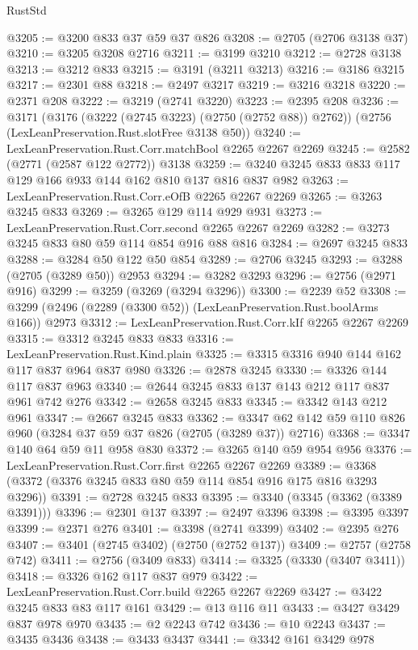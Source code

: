 \begin{lexlean}{RustStd}
\begin{coremodule}
@3205 := @3200 @833 @37 @59 @37 @826
@3208 := @2705 (@2706 @3138 @37)
@3210 := @3205 @3208 @2716
@3211 := @3199 @3210
@3212 := @2728 @3138
@3213 := @3212 @833
@3215 := @3191 (@3211 @3213)
@3216 := @3186 @3215
@3217 := @2301 @88
@3218 := @2497 @3217
@3219 := @3216 @3218
@3220 := @2371 @208
@3222 := @3219 (@2741 @3220)
@3223 := @2395 @208
@3236 := @3171
    (@3176 (@3222 (@2745 @3223) (@2750 (@2752 @88)) @2762))
    (@2756 (LexLeanPreservation.Rust.slotFree @3138 @50))
@3240 := LexLeanPreservation.Rust.Corr.matchBool @2265 @2267 @2269
@3245 := @2582 (@2771 (@2587 @122 @2772)) @3138
@3259 := @3240 @3245 @833 @833 @117 @129 @166 @933 @144 @162 @810 @137 @816 @837 @982
@3263 := LexLeanPreservation.Rust.Corr.eOfB @2265 @2267 @2269
@3265 := @3263 @3245 @833
@3269 := @3265 @129 @114 @929 @931
@3273 := LexLeanPreservation.Rust.Corr.second @2265 @2267 @2269
@3282 := @3273 @3245 @833 @80 @59 @114 @854 @916 @88 @816
@3284 := @2697 @3245 @833
@3288 := @3284 @50 @122 @50 @854
@3289 := @2706 @3245
@3293 := @3288 (@2705 (@3289 @50)) @2953
@3294 := @3282 @3293
@3296 := @2756 (@2971 @916)
@3299 := @3259 (@3269 (@3294 @3296))
@3300 := @2239 @52
@3308 := @3299 (@2496 (@2289 (@3300 @52)) (LexLeanPreservation.Rust.boolArms @166)) @2973
@3312 := LexLeanPreservation.Rust.Corr.kIf @2265 @2267 @2269
@3315 := @3312 @3245 @833 @833
@3316 := LexLeanPreservation.Rust.Kind.plain
@3325 := @3315 @3316 @940 @144 @162 @117 @837 @964 @837 @980
@3326 := @2878 @3245
@3330 := @3326 @144 @117 @837 @963
@3340 := @2644 @3245 @833 @137 @143 @212 @117 @837 @961 @742 @276
@3342 := @2658 @3245 @833
@3345 := @3342 @143 @212 @961
@3347 := @2667 @3245 @833
@3362 := @3347 @62 @142 @59 @110 @826 @960 (@3284 @37 @59 @37 @826 (@2705 (@3289 @37)) @2716)
@3368 := @3347 @140 @64 @59 @11 @958 @830
@3372 := @3265 @140 @59 @954 @956
@3376 := LexLeanPreservation.Rust.Corr.first @2265 @2267 @2269
@3389 := @3368 (@3372 (@3376 @3245 @833 @80 @59 @114 @854 @916 @175 @816 @3293 @3296))
@3391 := @2728 @3245 @833
@3395 := @3340 (@3345 (@3362 (@3389 @3391)))
@3396 := @2301 @137
@3397 := @2497 @3396
@3398 := @3395 @3397
@3399 := @2371 @276
@3401 := @3398 (@2741 @3399)
@3402 := @2395 @276
@3407 := @3401 (@2745 @3402) (@2750 (@2752 @137))
@3409 := @2757 (@2758 @742)
@3411 := @2756 (@3409 @833)
@3414 := @3325 (@3330 (@3407 @3411))
@3418 := @3326 @162 @117 @837 @979
@3422 := LexLeanPreservation.Rust.Corr.build @2265 @2267 @2269
@3427 := @3422 @3245 @833 @83 @117 @161
@3429 := @13 @116 @11
@3433 := @3427 @3429 @837 @978 @970
@3435 := @2 @2243 @742
@3436 := @10 @2243
@3437 := @3435 @3436
@3438 := @3433 @3437
@3441 := @3342 @161 @3429 @978

\end{coremodule}
\end{lexlean}
